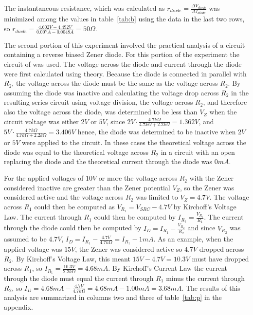 \documentclass{amsart}
\begin{document}
The instantaneous resistance, which was calculated as $r_{diode}=\frac{\Delta V_{diode}}{\Delta I_{diode}}$ was minimized among the values in table~\ref{tab:b} using the data in the last two rows, so $r_{diode}=\frac{4.602V-4.492V}{0.007A-0.0048A}=50\Omega$.

The second portion of this experiment involved the practical analysis of a circuit containing a reverse biased Zener diode.  For this portion of the experiment the circuit of  was used.  The voltage across the diode and current through the diode were first calculated using theory.  Because the diode is connected in parallel with $R_2$, the voltage across the diode must be the same as the voltage across $R_2$.  By assuming the diode was inactive and calculating the voltage drop across $R_2$ in the resulting series circuit using voltage division, the voltage across $R_2$, and therefore also the voltage across the diode, was determined to be less than $V_Z$ when the circuit voltage was either $2V$ or $5V$, since $2V\cdot \frac{4.7k\Omega}{4.7k\Omega+2.2k\Omega}=1.362V$, and $5V\cdot \frac{4.7k\Omega}{4.7k\Omega+2.2k\Omega}=3.406V$ hence, the diode was determined to be inactive when $2V$ or $5V$ were applied to the circuit.  In these cases the theoretical voltage across the diode was equal to the theoretical voltage across $R_2$ in a circuit with an open replacing the diode and the theoretical current through the diode was $0mA$.  

For the applied voltages of $10V$ or more the voltage across $R_2$ with the Zener considered inactive are greater than the Zener potential $V_Z$, so the Zener was considered active and the voltage across $R_2$ was limited to $V_Z=4.7V$.  The voltage across $R_1$ could then be computed as $V_{R_1}=V_{SRC}-4.7V$ by Kirchoff's Voltage Law.  The current through $R_1$ could then be computed by $I_{R_1}=\frac{V_{R_1}}{R_1}$.  The current through the diode could then be computed by $I_D=I_{R_1}-\frac{V_{R_2}}{R_2}$ and since $V_{R_2}$ was assumed to be $4.7V$, $I_D=I_{R_1}-\frac{4.7V}{4.7k\Omega}=I_{R_1}-1mA$. As an example, when the applied voltage was $15V$, the Zener was considered active so $4.7V$ dropped across $R_2$.  By Kirchoff's Voltage Law, this meant $15V-4.7V=10.3V$ must have dropped across $R_1$, so $I_{R_1}=\frac{10.3V}{2.2k\Omega}=4.68mA$.  By Kirchoff's Current Law the current through the diode must equal the current through $R_1$ minus the current through $R_2$, so $I_D=4.68mA-\frac{4.7V}{4.7k\Omega}=4.68mA-1.00mA=3.68mA$.  The results of this analysis are summarized in columns two and three of table~\ref{tab:p} in the appendix.
\end{document}
